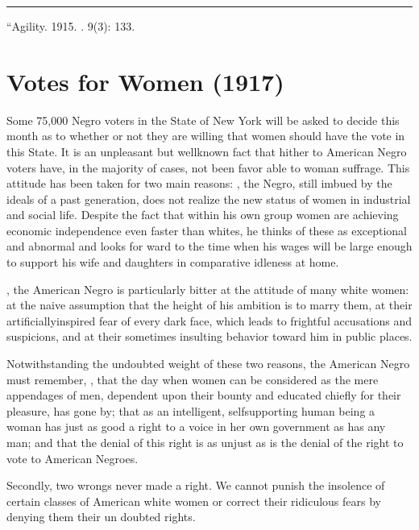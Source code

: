 \documentclass[letterpaper,10pt,english]{jupyterBook}
\begin{document}
\bigskip\hrule\bigskip


\sphinxAtStartPar
{} “Agility. 1915. . 9(3): 133.


\section{Votes for Women (1917)}
\label{\detokenize{Volumes/15/01/votes_for_women:votes-for-women-1917}}\label{\detokenize{Volumes/15/01/votes_for_women::doc}}
\sphinxAtStartPar
Some 75,000 Negro voters in the State of New York will be asked to decide this month as to whether or not they are willing that women should have the vote in this State. It is an unpleas­ant but well\sphinxhyphen{}known fact that hither­ to American Negro voters have, in the majority of cases, not been favor able to woman suffrage. This attitude has been taken for two main reasons: , the Negro, still imbued by the ideals of a past genera­tion, does not realize the new status of women in industrial and social life. Despite the fact that within his own­ group women are achieving economic independence even faster than whites, he thinks of these as excep­tional and abnormal and looks for­ ward to the time when his wages will be large enough to support his wife and daughters in comparative idleness at home.

\sphinxAtStartPar
{}, the American Negro is particularly bitter at the attitude of many white women: at the naive assumption that the height of his am­bition is to marry them, at their arti­ficially\sphinxhyphen{}inspired fear of every dark face, which leads to frightful accusa­tions and suspicions, and at their sometimes insulting behavior toward him in public places.

\sphinxAtStartPar
Notwithstanding the undoubted weight of these two reasons, the American Negro must remember, , that the day when women can be considered as the mere appendages of men, dependent upon their bounty and educated chiefly for their pleasure, has gone by; that as an in­telligent, self\sphinxhyphen{}supporting human be­ing a woman has just as good a right to a voice in her own government as has any man; and that the denial of this right is as unjust as is the denial of the right to vote to American Negroes.

\sphinxAtStartPar
Secondly, two wrongs never made a right. We cannot punish the insolence of certain classes of American white women or correct their ridicu­lous fears by denying them their un­ doubted rights.
\end{document}
